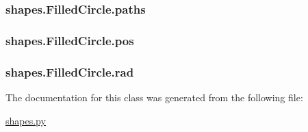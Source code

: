 \subsubsection[{paths}]{\setlength{\rightskip}{0pt plus 5cm}shapes.\+Filled\+Circle.\+paths}\label{classshapes_1_1_filled_circle_acefd4214639d5c1a8c82efab2bcca410}
\hypertarget{classshapes_1_1_filled_circle_ac694d06688a290a3931bebf794d27366}{}
\subsubsection[{pos}]{\setlength{\rightskip}{0pt plus 5cm}shapes.\+Filled\+Circle.\+pos}\label{classshapes_1_1_filled_circle_ac694d06688a290a3931bebf794d27366}
\hypertarget{classshapes_1_1_filled_circle_acf773eb81f9e81aabbc1877ad62a1c06}{}
\subsubsection[{rad}]{\setlength{\rightskip}{0pt plus 5cm}shapes.\+Filled\+Circle.\+rad}\label{classshapes_1_1_filled_circle_acf773eb81f9e81aabbc1877ad62a1c06}


The documentation for this class was generated from the following file\+:\begin{DoxyCompactItemize}
\item 
\hyperlink{shapes_8py}{shapes.\+py}\end{DoxyCompactItemize}
